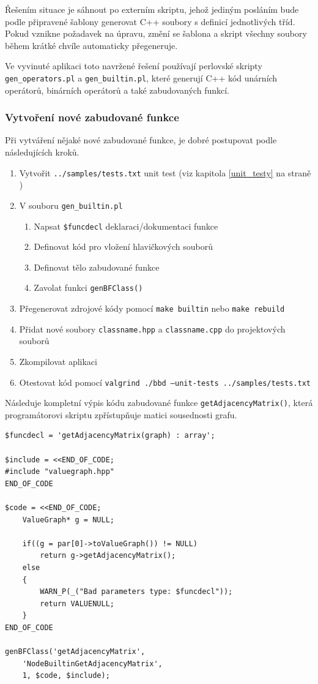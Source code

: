 \documentclass[11pt,twoside,a4paper]{book}
\begin{document}
Řešením situace je sáhnout po externím skriptu, jehož jediným posláním bude podle při\-pra\-ve\-né šablony generovat C++ soubory s definicí jednotlivých tříd. Pokud vznikne požadavek na úpravu, změní se šablona a skript všechny soubory během krátké chvíle automaticky přegeneruje.

Ve vyvinuté aplikaci toto navržené řešení používají perlovské skripty \texttt{gen\_\-ope\-ra\-tors.pl} a \texttt{gen\_builtin.pl}, které generují C++ kód unárních operátorů, binárních operátorů a také zabudovaných funkcí.


\subsubsection{Vytvoření nové zabudované funkce}

Při vytváření nějaké nové zabudované funkce, je dobré postupovat podle následujících kroků.

\begin{enumerate}
\item Vytvořit \texttt{../samples/tests.txt} unit test (viz kapitola \ref{unit_testy} na straně \pageref{unit_testy})
\item V souboru \texttt{gen\_builtin.pl}
\begin{enumerate}
\item Napsat \texttt{\$funcdecl} deklaraci/dokumentaci funkce
\item Definovat kód pro vložení hlavičkových souborů
\item Definovat tělo zabudované funkce
\item Zavolat funkci \texttt{genBFClass()}
\end{enumerate}
\item Přegenerovat zdrojové kódy pomocí \texttt{make builtin} nebo \texttt{make rebuild}
\item Přidat nové soubory \texttt{classname.hpp} a \texttt{classname.cpp} do projektových souborů
\item Zkompilovat aplikaci
\item Otestovat kód pomocí \texttt{valgrind ./bbd --unit-tests ../samples/tests.txt}
\end{enumerate}

Následuje kompletní výpis kódu zabudované funkce \texttt{getAdjacencyMatrix()}, která pro\-gra\-má\-to\-ro\-vi skriptu zpřístupňuje matici sousednosti grafu.

\begin{verbatim}
$funcdecl = 'getAdjacencyMatrix(graph) : array';

$include = <<END_OF_CODE;
#include "valuegraph.hpp"
END_OF_CODE

$code = <<END_OF_CODE;
    ValueGraph* g = NULL;

    if((g = par[0]->toValueGraph()) != NULL)
        return g->getAdjacencyMatrix();
    else
    {
        WARN_P(_("Bad parameters type: $funcdecl"));
        return VALUENULL;
    }
END_OF_CODE

genBFClass('getAdjacencyMatrix',
    'NodeBuiltinGetAdjacencyMatrix',
    1, $code, $include);
\end{verbatim}
\end{document}
